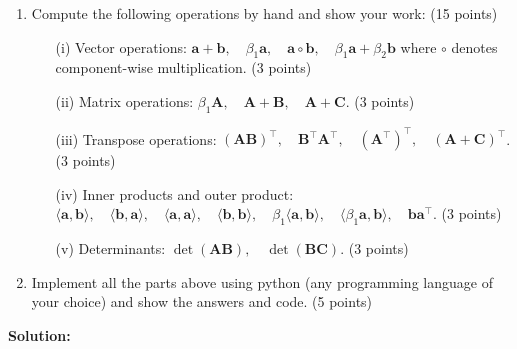 \documentclass[11pt,letterpaper]{article}
\begin{document}
\begin{enumerate}
\begin{enumerate}
\item Compute the following operations by hand and show your work: (15 points)
\begin{enumerate}
    \item [(i)] Vector operations:
    $\mathbf{a} + \mathbf{b}, \quad \beta_1 \mathbf{a}, \quad \mathbf{a} \circ \mathbf{b}, \quad \beta_1 \mathbf{a} + \beta_2 \mathbf{b}$
    where $\circ$ denotes component-wise multiplication. (3 points)
    
    \item [(ii)] Matrix operations: $\beta_1 \mathbf{A}, \quad \mathbf{A} + \mathbf{B}, \quad \mathbf{A} + \mathbf{C}$. (3 points)
    
    \item [(iii)] Transpose operations: $(\mathbf{AB})^\top, \quad \mathbf{B}^\top \mathbf{A}^\top, \quad (\mathbf{A}^{\top})^{\top}, \quad (\mathbf{A} + \mathbf{C})^\top$. (3 points)
    
    \item [(iv)] Inner products and outer product: $\langle \mathbf{a}, \mathbf{b} \rangle, \quad \langle \mathbf{b}, \mathbf{a} \rangle, \quad \langle \mathbf{a}, \mathbf{a} \rangle, \quad \langle \mathbf{b}, \mathbf{b} \rangle, \quad \beta_1 \langle \mathbf{a}, \mathbf{b} \rangle, \quad \langle \beta_1 \mathbf{a}, \mathbf{b} \rangle, \quad \mathbf{b} \mathbf{a}^\top $. (3 points)
    
    \item [(v)] Determinants: $\det(\mathbf{AB}), \quad \det(\mathbf{BC})$. (3 points)
\end{enumerate}

\item Implement all the parts above using python (any programming language of your choice)  and show the answers and code. (5 points)

\end{enumerate}


\end{enumerate}


\textbf{Solution:}
\end{document}
